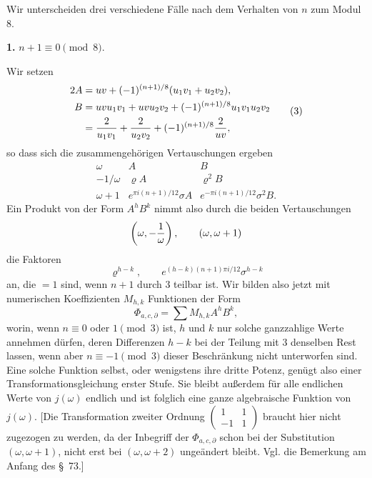 \documentclass[11pt]{article}
\begin{document}
Wir unterscheiden drei verschiedene Fälle nach dem Verhalten von $n$ zum Modul 8.

\medskip
\noindent\textbf{1.} $n+1\equiv0\pmod 8$.

Wir setzen
\begin{equation}
\begin{aligned}
 2A&=uv+(-1)^{(n+1)/8}(u_1v_1+u_2v_2),\\
 B&=uvu_1v_1+uvu_2v_2+(-1)^{(n+1)/8}u_1v_1u_2v_2\\
 &= {2\over u_1v_1}+{2\over u_2v_2}+(-1)^{(n+1)/8}{2\over uv},
\end{aligned}
\tag{3}
\end{equation}
so dass sich die zusammengehörigen Vertauschungen ergeben
\begin{equation}
\begin{array}{c|cc}
\omega&A&B\\[0.2em]
-1/\omega&\varrho A&\varrho^2B\\[0.2em]
\omega+1&e^{\pi i(n+1)/12}\sigma A&e^{-\pi i(n+1)/12}\sigma^2B.
\end{array}
\tag{4}
\end{equation}
Ein Produkt von der Form $A^hB^k$ nimmt also durch die beiden Vertauschungen
\[
 \left(\omega,-{1\over\omega}\right),\qquad (\omega,\omega+1)
\]
die Faktoren
\[
 \varrho^{h-k},\qquad e^{(h-k)(n+1)\pi i/12}\sigma^{h-k}
\]
an, die $=1$ sind, wenn $n+1$ durch $3$ teilbar ist. Wir bilden also jetzt mit numerischen Koeffizienten $M_{h,k}$ Funktionen der Form
\begin{equation}
 \Phi_{a,c,\partial}=\sum M_{h,k}A^hB^k,
\tag{5}
\end{equation}
worin, wenn $n\equiv0$ oder $1\pmod3$ ist, $h$ und $k$ nur solche ganzzahlige Werte annehmen dürfen, deren Differenzen $h-k$ bei der Teilung mit $3$ denselben Rest lassen, wenn aber $n\equiv-1\pmod3$ dieser Beschränkung nicht unterworfen sind. Eine solche Funktion selbst, oder wenigstens ihre dritte Potenz, genügt also einer Transformationsgleichung erster Stufe. Sie bleibt außerdem für alle endlichen Werte von $j(\omega)$ endlich und ist folglich eine ganze algebraische Funktion von $j(\omega)$. [Die Transformation zweiter Ordnung $\begin{pmatrix}1&1\\-1&1\end{pmatrix}$ braucht hier nicht zugezogen zu werden, da der Inbegriff der $\Phi_{a,c,\partial}$ schon bei der Substitution $(\omega,\omega+1)$, nicht erst bei $(\omega,\omega+2)$ ungeändert bleibt. Vgl. die Bemerkung am Anfang des \S~73.]
\end{document}
